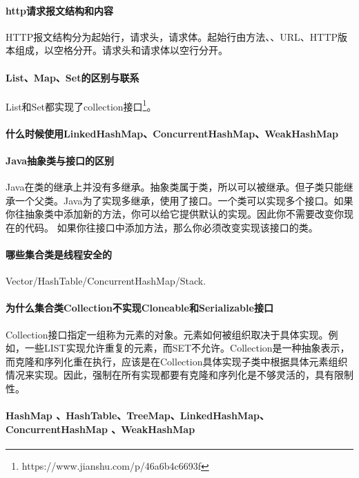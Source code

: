\documentclass[../../../interview-questions.tex]{subfiles}
\begin{document}
\paragraph{http请求报文结构和内容}

HTTP报文结构分为起始行，请求头，请求体。起始行由方法、、URL、HTTP版本组成，以空格分开。请求头和请求体以空行分开。


\paragraph{List、Map、Set的区别与联系}

List和Set都实现了collection接口\footnote{https://www.jianshu.com/p/46a6b4c6693f}。


\paragraph{什么时候使用LinkedHashMap、ConcurrentHashMap、WeakHashMap}

\paragraph{Java抽象类与接口的区别}

Java在类的继承上并没有多继承。抽象类属于类，所以可以被继承。但子类只能继承一个父类。Java为了实现多继承，使用了接口。一个类可以实现多个接口。如果你往抽象类中添加新的方法，你可以给它提供默认的实现。因此你不需要改变你现在的代码。 如果你往接口中添加方法，那么你必须改变实现该接口的类。

\paragraph{哪些集合类是线程安全的}

Vector/HashTable/ConcurrentHashMap/Stack.


\paragraph{为什么集合类Collection不实现Cloneable和Serializable接口}

Collection接口指定一组称为元素的对象。元素如何被组织取决于具体实现。例如，一些LIST实现允许重复的元素，而SET不允许。Collection是一种抽象表示，而克隆和序列化重在执行，应该是在Collection具体实现子类中根据具体元素组织情况来实现。因此，强制在所有实现都要有克隆和序列化是不够灵活的，具有限制性。


\paragraph{HashMap 、HashTable、TreeMap、LinkedHashMap、ConcurrentHashMap 、WeakHashMap}
\end{document}
